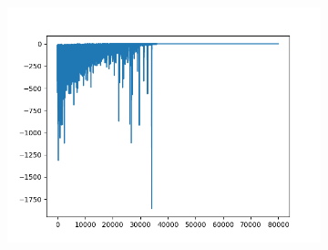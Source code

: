 \begin{figure}[H]
\begin{subfigure}{.25\textwidth}
	\end{subfigure}%
	\begin{subfigure}{.25\textwidth}
		\includegraphics[width=\textwidth]{img/train/matrice_15-11_40_48.png}
	\end{subfigure}%
	

\end{figure}
